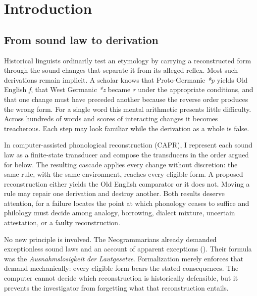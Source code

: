 \documentclass[
  british,
  a4paper,
  openany]{book}
\author{}
\date{}
\begin{document}
\frontmatter

{
\setcounter{tocdepth}{0}
\tableofcontents
}
\mainmatter
\mainmatter

\chapter{Introduction}\label{introduction}

\section{From sound law to
derivation}\label{from-sound-law-to-derivation}

Historical linguists ordinarily test an etymology by carrying a
reconstructed form through the sound changes that separate it from its
alleged reflex. Most such derivations remain implicit. A scholar knows
that Proto-Germanic \emph{*p} yields Old English \emph{f}, that West
Germanic \emph{*z} became \emph{r} under the appropriate conditions, and
that one change must have preceded another because the reverse order
produces the wrong form. For a single word this mental arithmetic
presents little difficulty. Across hundreds of words and scores of
interacting changes it becomes treacherous. Each step may look familiar
while the derivation as a whole is false.

In computer-assisted phonological reconstruction (CAPR), I represent
each sound law as a finite-state transducer and compose the transducers
in the order argued for below. The resulting cascade applies every
change without discretion: the same rule, with the same environment,
reaches every eligible form. A proposed reconstruction either yields the
Old English comparator or it does not. Moving a rule may repair one
derivation and destroy another. Both results deserve attention, for a
failure locates the point at which phonology ceases to suffice and
philology must decide among analogy, borrowing, dialect mixture,
uncertain attestation, or a faulty reconstruction.

No new principle is involved. The Neogrammarians already demanded
exceptionless sound laws and an account of apparent exceptions
().
Their formula was the \emph{Ausnahmslosigkeit der Lautgesetze}.
Formalization merely enforces that demand mechanically: every eligible
form bears the stated consequences. The computer cannot decide which
reconstruction is historically defensible, but it prevents the
investigator from forgetting what that reconstruction entails.
\end{document}
